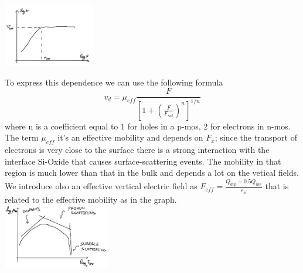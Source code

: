 \centering
\includegraphics[width=0.3\textwidth]{satvel.png}\\
\raggedright

To express this dependence we can use the following formula 
\begin{equation}
v_d=\mu_{eff}\frac{F}{[1+\left(\frac{F}{F_{sat}}\right)^n]^{1/n}}
\end{equation}
where n is a coefficient equal to 1 for holes in a p-mos, 2 for electrons in n-mos.\\ 
The term $\mu_{eff}$ it's an effective mobility and depends on $F_x$; since the transport of electrons is very close to the surface there is a strong interaction with the interface Si-Oxide that causes surface-scattering events. The mobility in that region is much lower than that in the bulk and depends a lot on the vetical fields. We introduce olso an effective vertical electric field as $F_{eff}=\frac{Q_{dep}+0.5Q_{inv}}{\varepsilon_{si}}$ that is related to the effective mobility as in the graph.\\

\centering
\includegraphics[width=0.35\textwidth]{muefff.png}\\
\raggedright

